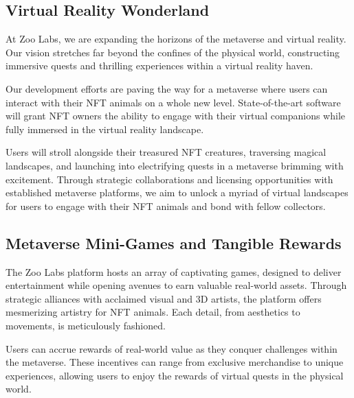\subsection{Virtual Reality Wonderland}

At Zoo Labs, we are expanding the horizons of the metaverse and virtual reality. Our vision stretches far beyond the confines of the physical world, constructing immersive quests and thrilling experiences within a virtual reality haven.

Our development efforts are paving the way for a metaverse where users can interact with their NFT animals on a whole new level. State-of-the-art software will grant NFT owners the ability to engage with their virtual companions while fully immersed in the virtual reality landscape.

Users will stroll alongside their treasured NFT creatures, traversing magical landscapes, and launching into electrifying quests in a metaverse brimming with excitement. Through strategic collaborations and licensing opportunities with established metaverse platforms, we aim to unlock a myriad of virtual landscapes for users to engage with their NFT animals and bond with fellow collectors.

\subsection{Metaverse Mini-Games and Tangible Rewards}

The Zoo Labs platform hosts an array of captivating games, designed to deliver entertainment while opening avenues to earn valuable real-world assets. Through strategic alliances with acclaimed visual and 3D artists, the platform offers mesmerizing artistry for NFT animals. Each detail, from aesthetics to movements, is meticulously fashioned.

Users can accrue rewards of real-world value as they conquer challenges within the metaverse. These incentives can range from exclusive merchandise to unique experiences, allowing users to enjoy the rewards of virtual quests in the physical world.
